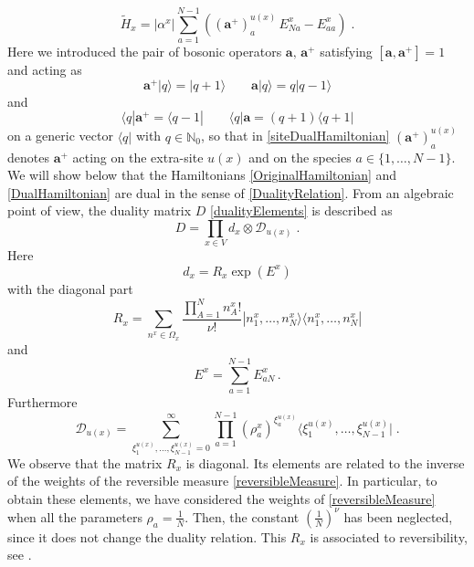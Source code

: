 \documentclass[10pt]{article}
\numberwithin{equation}{section}
\numberwithin{equation}{subsection}
\newcommand{\dt}{\;.}
\newcommand{\dd}{\mathcal{D}_{u(x)}}
\begin{document}
\begin{equation}\label{siteDualHamiltonian}
    \widetilde{H}_{x}=|\alpha^{x}|\sum_{a=1}^{N-1}\left((\mathbf{a}^{+})_{a}^{u(x)}\,E_{Na}^{x}-E_{aa}^{x}\right)\dt
\end{equation}
Here we introduced the pair of bosonic operators $\mathbf{a},\,\mathbf{a}^{+}$ satisfying $[\mathbf{a},\mathbf{a}^{+}]=1$ and acting as
\begin{equation}
	\mathbf{a}^{+}|q\rangle=|q+1\rangle\qquad \mathbf{a}|q\rangle=q|q-1\rangle
\end{equation}
and 
\begin{equation}\label{bosonic_2}
	\langle q|\mathbf{a}^{+}=\langle q-1|\qquad \langle q|\mathbf{a}=(q+1) \langle q+1|
\end{equation}
on a generic vector $\langle q|$ with $q\in \mathbb{N}_{0}$, so that in \eqref{siteDualHamiltonian} 
$(\mathbf{a}^{+})_{a}^{u(x)}$ denotes  $\mathbf{a}^{+}$ acting on the extra-site $u(x)$ and on the species $a\in\{1,\ldots,N-1\}$. \\

We will show below that the Hamiltonians \eqref{OriginalHamiltonian} and \eqref{DualHamiltonian} are dual in the sense of \eqref{DualityRelation}. From an algebraic point of view, the duality matrix $D$ \eqref{dualityElements} is described as 
\begin{equation}\label{dualityMatrix}
    D=\prod_{x\in V}d_{x}\otimes \dd \;.
\end{equation}
Here
\begin{equation}\label{bulkElementDualityMatrix}
d_{x}=R_{x}\exp{(E^{x})}
\end{equation}
with  the diagonal part
\begin{equation}\label{Revmatrix}
    R_{x} =\sum_{n^{x}\in\Omega_{x}}\frac{\prod_{A=1}^{N}n_{A}^{x}!}{\nu!}|n_{1}^{x},\ldots,n_{N}^{x}\rangle\langle n_{1}^{x},\ldots,n_{N}^{x}|
\end{equation}
and
\begin{equation}\label{EquationEx}
E^{x}=\sum_{a=1}^{N-1}E_{aN}^{x}\,.
\end{equation}
Furthermore
\begin{equation}\label{dualityMatrix2}
\dd=\sum_{\xi_{1}^{u(x)},\ldots,\xi_{N-1}^{u(x)}=0}^{\infty}\prod_{a=1}^{N-1}\left(\rho_{a}^{x}\right)^{\xi_{a}^{u(x)}}\langle \xi_{1}^{u(x)},\ldots,\xi_{N-1}^{u(x)}|\dt
\end{equation}
We observe that the matrix $R_{x}$ is diagonal. Its elements are related to the inverse of the weights of the reversible measure \eqref{reversibleMeasure}. In particular, to obtain these elements, we have considered the weights of \eqref{reversibleMeasure} when all the parameters $\rho_{a}=\frac{1}{N}$. Then, the constant $\left(\frac{1}{N}\right)^{\nu}$ has been neglected, since it does not change the duality relation. This $R_{x}$   is associated to reversibility, see \cite{giardina2009duality}. \\
\end{document}

